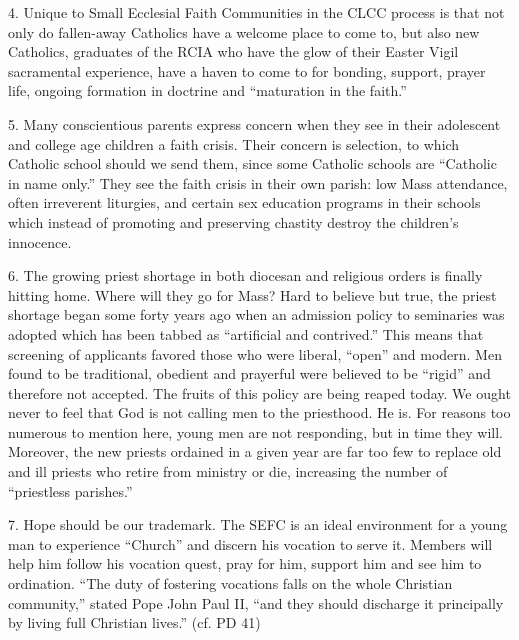 \documentclass[oneside]{book}
\begin{document}
4. Unique to Small Ecclesial Faith Communities in the CLCC process is that not
only do fallen-away Catholics have a welcome place to come to, but also new
Catholics, graduates of the RCIA who have the glow of their Easter Vigil
sacramental experience, have a haven to come to for bonding, support, prayer
life, ongoing formation in doctrine and ``maturation in the faith.''

5. Many conscientious parents express concern when they see in their adolescent
and college age children a faith crisis. Their concern is selection, to which
Catholic school should we send them, since some Catholic schools are ``Catholic
in name only.'' They see the faith crisis in their own parish: low Mass
attendance, often irreverent liturgies, and certain sex education programs in
their schools which instead of promoting and preserving chastity destroy the
children's innocence.

6. The growing priest shortage in both diocesan and religious orders is finally
hitting home. Where will they go for Mass? Hard to believe but true, the priest
shortage began some forty years ago when an admission policy to seminaries was
adopted which has been tabbed as ``artificial and contrived.'' This means that
screening of applicants favored those who were liberal, ``open'' and modern. Men
found to be traditional, obedient and prayerful were believed to be ``rigid''
and therefore not accepted. The fruits of this policy are being reaped today. We
ought never to feel that God is not calling men to the priesthood. He is. For
reasons too numerous to mention here, young men are not responding, but in time
they will. Moreover, the new priests ordained in a given year are far too few to
replace old and ill priests who retire from ministry or die, increasing the
number of ``priestless parishes.''

7. Hope should be our trademark. The SEFC is an ideal environment for a young
man to experience ``Church'' and discern his vocation to serve it. Members will
help him follow his vocation quest, pray for him, support him and see him to
ordination. ``The duty of fostering vocations falls on the whole Christian
community,'' stated Pope John Paul II, ``and they should discharge it
principally by living full Christian lives.'' (cf. PD 41)
\end{document}
